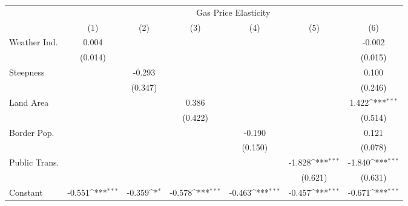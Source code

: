 {
\def\sym#1{\ifmmode^{#1}\else\(^{#1}\)\fi}
\begin{tabular}{l*{6}{c}}
\hline\hline
            &\multicolumn{6}{c}{Gas Price Elasticity}                                                                                           \\
            &\multicolumn{1}{c}{(1)}         &\multicolumn{1}{c}{(2)}         &\multicolumn{1}{c}{(3)}         &\multicolumn{1}{c}{(4)}         &\multicolumn{1}{c}{(5)}         &\multicolumn{1}{c}{(6)}         \\
\hline
Weather Ind.&       0.004         &                     &                     &                     &                     &      -0.002         \\
            &     (0.014)         &                     &                     &                     &                     &     (0.015)         \\
[1em]
Steepness   &                     &      -0.293         &                     &                     &                     &       0.100         \\
            &                     &     (0.347)         &                     &                     &                     &     (0.246)         \\
[1em]
Land Area   &                     &                     &       0.386         &                     &                     &       1.422\sym{***}\\
            &                     &                     &     (0.422)         &                     &                     &     (0.514)         \\
[1em]
Border Pop. &                     &                     &                     &      -0.190         &                     &       0.121         \\
            &                     &                     &                     &     (0.150)         &                     &     (0.078)         \\
[1em]
Public Trans.&                     &                     &                     &                     &      -1.828\sym{***}&      -1.840\sym{***}\\
            &                     &                     &                     &                     &     (0.621)         &     (0.631)         \\
[1em]
Constant    &      -0.551\sym{***}&      -0.359\sym{*}  &      -0.578\sym{***}&      -0.463\sym{***}&      -0.457\sym{***}&      -0.671\sym{***}\\

\end{tabular}}
